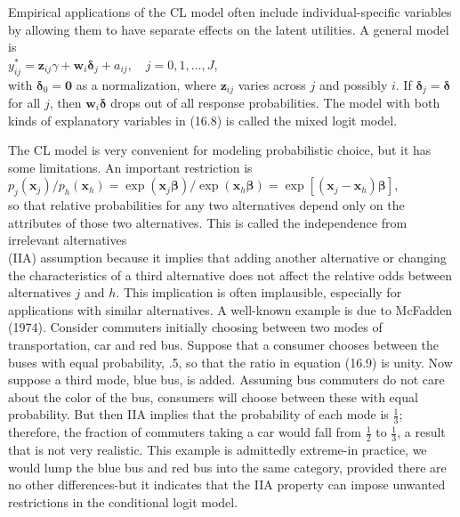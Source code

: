 \documentclass[10pt]{article}
\begin{document}
Empirical applications of the CL model often include individual-specific variables by allowing them to have separate effects on the latent utilities. A general model is\\
$y_{i j}^{*}=\mathbf{z}_{i j} \gamma+\mathbf{w}_{i} \boldsymbol{\delta}_{j}+a_{i j}, \quad j=0,1, \ldots, J$,\\
with $\boldsymbol{\delta}_{0}=\mathbf{0}$ as a normalization, where $\mathbf{z}_{i j}$ varies across $j$ and possibly $i$. If $\boldsymbol{\delta}_{j}=\boldsymbol{\delta}$ for all $j$, then $\mathbf{w}_{i} \boldsymbol{\delta}$ drops out of all response probabilities. The model with both kinds of explanatory variables in (16.8) is called the mixed logit model.

The CL model is very convenient for modeling probabilistic choice, but it has some limitations. An important restriction is\\
$p_{j}\left(\mathbf{x}_{j}\right) / p_{h}\left(\mathbf{x}_{h}\right)=\exp \left(\mathbf{x}_{j} \boldsymbol{\beta}\right) / \exp \left(\mathbf{x}_{h} \boldsymbol{\beta}\right)=\exp \left[\left(\mathbf{x}_{j}-\mathbf{x}_{h}\right) \boldsymbol{\beta}\right]$,\\
so that relative probabilities for any two alternatives depend only on the attributes of those two alternatives. This is called the independence from irrelevant alternatives\\
(IIA) assumption because it implies that adding another alternative or changing the characteristics of a third alternative does not affect the relative odds between alternatives $j$ and $h$. This implication is often implausible, especially for applications with similar alternatives. A well-known example is due to McFadden (1974). Consider commuters initially choosing between two modes of transportation, car and red bus. Suppose that a consumer chooses between the buses with equal probability, .5, so that the ratio in equation (16.9) is unity. Now suppose a third mode, blue bus, is added. Assuming bus commuters do not care about the color of the bus, consumers will choose between these with equal probability. But then IIA implies that the probability of each mode is $\frac{1}{3}$; therefore, the fraction of commuters taking a car would fall from $\frac{1}{2}$ to $\frac{1}{3}$, a result that is not very realistic. This example is admittedly extreme-in practice, we would lump the blue bus and red bus into the same category, provided there are no other differences-but it indicates that the IIA property can impose unwanted restrictions in the conditional logit model.
\end{document}
